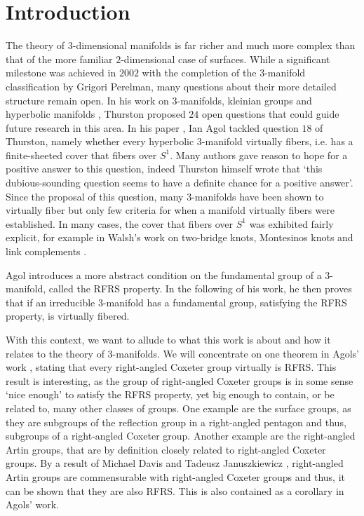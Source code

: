 \chapter{Introduction}\label{ch:introduction}

The theory of \(3\)-dimensional manifolds is far richer and much more complex than that of the more familiar \(2\)-dimensional case of surfaces.
While a significant milestone was achieved in \(2002\) with the completion of the \(3\)-manifold classification by Grigori Perelman, many questions about their more detailed structure remain open.
In his work on \(3\)-manifolds, kleinian groups and hyperbolic manifolds \cite{Thurston1982}, Thurston proposed \(24\) open questions that could guide future research in this area.
In his paper \cite{Agol2008}, Ian Agol tackled question \(18\) of Thurston, namely whether every hyperbolic \(3\)-manifold virtually fibers, i.e. has a finite-sheeted cover that fibers over \(S^1\).
Many authors gave reason to hope for a positive answer to this question, indeed Thurston himself wrote that `this dubious-sounding question seems to have a definite chance for a positive answer'.
Since the proposal of this question, many \(3\)-manifolds have been shown to virtually fiber but only few criteria for when a manifold virtually fibers were established.
In many cases, the cover that fibers over \(S^1\) was exhibited fairly explicit, for example in Walsh's work on two-bridge knots, Montesinos knots and link complements \cite{Walsh2004}.

Agol introduces a more abstract condition on the fundamental group of a \(3\)-manifold, called the RFRS property.
In the following of his work, he then proves that if an irreducible \(3\)-manifold has a fundamental group, satisfying the RFRS property, is virtually fibered.

With this context, we want to allude to what this work is about and how it relates to the theory of \(3\)-manifolds.
We will concentrate on one theorem in Agols' work \cite[Criteria for virtual fibering]{Agol2008}, stating that every right-angled Coxeter group virtually is RFRS.
This result is interesting, as the group of right-angled Coxeter groups is in some sense `nice enough' to satisfy the RFRS property, yet big enough to contain, or be related to, many other classes of groups.
One example are the surface groups, as they are subgroups of the reflection group in a right-angled pentagon and thus, subgroups of a right-angled Coxeter group.
Another example are the right-angled Artin groups, that are by definition closely related to right-angled Coxeter groups.
By a result of Michael Davis and Tadeusz Januszkiewicz \cite{Davis2000}, right-angled Artin groups are commensurable with right-angled Coxeter groups and thus, it can be shown that they are also RFRS.
This is also contained as a corollary in Agols' work.

